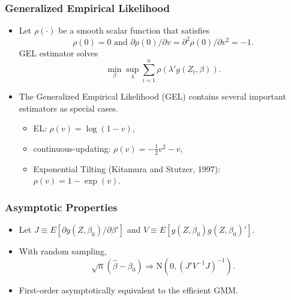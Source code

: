 \documentclass{beamer}
\begin{document}
\begin{frame}
\frametitle{Generalized Empirical Likelihood}
\begin{itemize}

\item Let \(\rho(\cdot)\) be a smooth scalar function that satisfies \[\rho(0)
= 0 \mbox{ and } \partial \rho(0)/\partial v = \partial^2 \rho(0) / \partial v^2 = -1. \] GEL estimator solves
\begin{displaymath}
\min_\beta \sup_\lambda \sum_{i=1}^n \rho \left( \lambda'g(Z_i,\beta) \right).
\end{displaymath} 
\item The Generalized Empirical Likelihood (GEL) contains several important
estimators as special cases.
\begin{itemize}
\item EL:  \(\rho(v) = \log(1-v)\), 
\item continuous-updating: \(\rho(v) = -\frac{1}{2} v^2 - v\),
\item Exponential Tilting (Kitamura and Stutzer, 1997): \(\rho(v) = 1-\exp(v) \).

\end{itemize}

 \end{itemize}
\end{frame}


\begin{frame}
\frametitle{Asymptotic Properties}

\begin{itemize}
\item Let \(J\equiv E\left[ \partial g(Z,\beta_0)/\partial\beta' \right]\) and \(V\equiv E\left[ g(Z,\beta_0) g(Z,\beta_0)' \right]\). 

\item With random sampling, 
\[
\sqrt{n} \left( \widehat{\beta} - \beta_0 \right) \Rightarrow 
\mathrm{N}\left(0,\left(J'V^{-1}J \right)^{-1}
\right).
\]
\item First-order asymptotically equivalent to the efficient GMM.
\end{itemize}
\end{frame}
\end{document}
